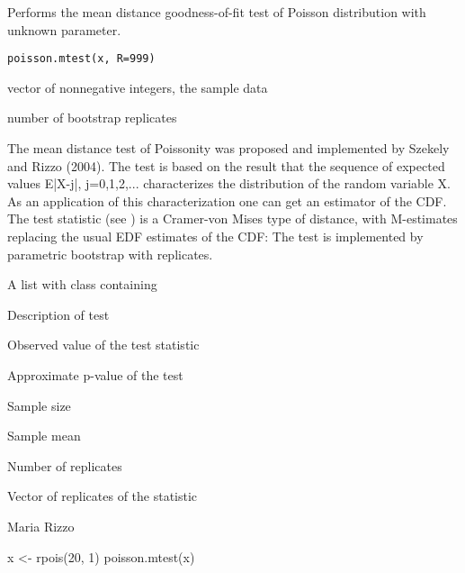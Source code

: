 \begin{Description}\relax
Performs the mean distance goodness-of-fit test of Poisson distribution
with unknown parameter.
\end{Description}
\begin{Usage}
\begin{verbatim}
poisson.mtest(x, R=999)
\end{verbatim}
\end{Usage}
\begin{Arguments}
\begin{ldescription}
\item[\code{x}] vector of nonnegative integers, the sample data 
\item[\code{R}] number of bootstrap replicates 
\end{ldescription}
\end{Arguments}
\begin{Details}\relax
The mean distance test of Poissonity was proposed and implemented by Szekely and Rizzo (2004). The test is based on the result that the sequence of expected values E|X-j|, j=0,1,2,... characterizes the distribution of the random  variable X. As an application of this characterization one can get an estimator  of the CDF. The test statistic (see ) is a Cramer-von Mises type of distance, with M-estimates replacing the usual EDF estimates of the CDF:
 The test is implemented by parametric bootstrap with  replicates.
\end{Details}
\begin{Value}
A list with class  containing
\begin{ldescription}
\item[\code{method}] Description of test
\item[\code{statistic}] Observed value of the test statistic
\item[\code{p.value}] Approximate p-value of the test
\item[\code{n}] Sample size
\item[\code{lambda}] Sample mean
\item[\code{R}] Number of replicates
\item[\code{replicates}] Vector of replicates of the statistic
\end{ldescription}
\end{Value}
\begin{Author}\relax
Maria Rizzo 
\end{Author}
\begin{SeeAlso}\relax
{}
\end{SeeAlso}
\begin{Examples}
\begin{ExampleCode}
 x <- rpois(20, 1)
 poisson.mtest(x)
 \end{ExampleCode}
\end{Examples}

